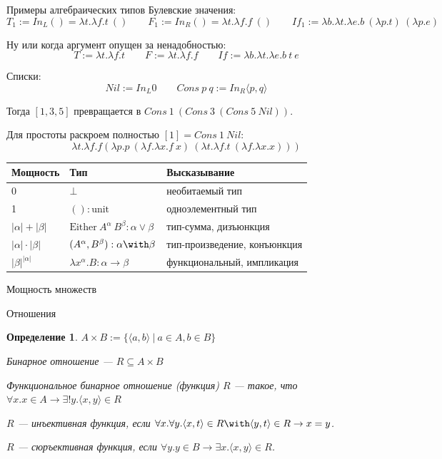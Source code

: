 \documentclass[aspectratio=169]{beamer}
\newtheorem{dfn}{Определение}[section]
\begin{document}
\begin{frame}{Примеры алгебраических типов}
Булевские значения:
$$T_1 := In_L () = \lambda t.\lambda f.t\ ()\quad\quad F_1 := In_R () = \lambda t.\lambda f.f\ ()\quad\quad If_1 := \lambda b.\lambda t.\lambda e.b\ (\lambda p.t)\ (\lambda p.e)$$

Ну или когда аргумент опущен за ненадобностью:
$$T := \lambda t.\lambda f.t\quad\quad F := \lambda t.\lambda f.f\quad\quad If := \lambda b.\lambda t.\lambda e.b\ t\ e$$

Списки:
$$Nil := In_L 0\quad\quad Cons\ p\ q := In_R\langle p, q \rangle$$

Тогда $[1,3,5]$ превращается в 
$Cons\ 1\ (Cons\ 3\ (Cons\ 5\ Nil))$.

Для простоты раскроем полностью $[1] = Cons\ 1\ Nil$:
$$\lambda t.\lambda f.f (\lambda p.p\ (\lambda f.\lambda x.f\ x)\ (\lambda t.\lambda f.t\ (\lambda f.\lambda x.x)))$$
\end{frame}

\begin{frame}
\begin{center}\begin{tabular}{lll}
Мощность & Тип & Высказывание\\\hline
0 & $\bot$ & необитаемый тип\\
1 & $(): \text{unit}$ & одноэлементный тип\\
$|\alpha|+|\beta|$ & $\text{Either}\ A^\alpha\ B^\beta : \alpha \vee \beta$ & тип-сумма, дизъюнкция\\
$|\alpha|\cdot|\beta|$ & $(A^\alpha, B^\beta) : \alpha \with \beta$ & тип-произведение, конъюнкция\\
$|\beta|^{|\alpha|}$ & $\lambda x^\alpha.B : \alpha \rightarrow \beta$ & функциональный, импликация
\end{tabular}\end{center}
\end{frame}


\begin{frame}{}
\LARGE\begin{center}Мощность множеств\end{center}
\end{frame}

\begin{frame}{Отношения}
\begin{dfn}$A \times B := \{\langle a,b \rangle\ |\ a \in A, b \in B\}$

Бинарное отношение --- $R \subseteq A \times B$

Функциональное бинарное отношение (функция) $R$ --- такое, что $\forall x.x\in A\rightarrow\exists !y.\langle x,y\rangle \in R$

$R$ --- инъективная функция, если $\forall x.\forall y.\langle x,t\rangle \in R\with \langle y,t\rangle \in R \rightarrow x=y$.

$R$ --- сюръективная функция, если $\forall y.y \in B\rightarrow\exists x.\langle x,y\rangle\in R$.\end{dfn}
\end{frame}
\end{document}
